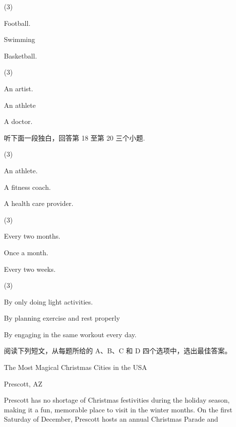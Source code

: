 \documentclass{英语试卷}
\begin{document}
\begin{choices}(3)
  \item Football.
  \item Swimming
  \item Basketball.
\end{choices}
\begin{choices}(3)
  \item An artist.
  \item An athlete
  \item A doctor.
\end{choices}
\par 听下面一段独白，回答第 18 至第 20 三个小题.\par
{}
\begin{choices}(3)
  \item An athlete.
  \item A fitness coach.
  \item A health care provider.
\end{choices}
\begin{choices}(3)
  \item Every two months.
  \item Once a month.
  \item Every two weeks.
\end{choices}
\begin{choices}(3)
  \item By only doing light activities.
  \item By planning exercise and rest properly
  \item By engaging in the same workout every day.
\end{choices}
\par 阅读下列短文，从每题所给的 A、B、C 和 D 四个选项中，选出最佳答案。\par
{}
\par The Most Magical Christmas Cities in the USA\par
\par Prescott, AZ\par
\par Prescott has no shortage of Christmas festivities during the holiday season, making it a fun, memorable place to visit in the winter months. On the first Saturday of December, Prescott hosts an annual Christmas Parade and\par
\end{document}
